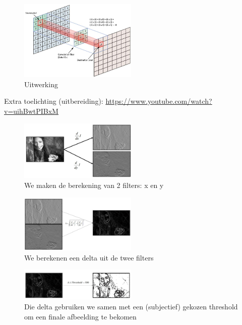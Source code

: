 \documentclass{article}
\begin{document}
\begin{figure}[H]
    \centering
    \includegraphics[width=0.5\textwidth]{sobel-edgedetection2.png}
    \caption{Uitwerking}
\end{figure}


Extra toelichting (uitbereiding): \url{https://www.youtube.com/watch?v=uihBwtPIBxM}

\begin{figure}[H]
    \centering
    \includegraphics[width=0.5\textwidth]{sobel.png}
    \caption{We maken de berekening van 2 filters: x en y}
\end{figure}

\begin{figure}[H]
    \centering
    \includegraphics[width=0.5\textwidth]{sobel2.png}
    \caption{We berekenen een delta uit de twee filters}
\end{figure}

\begin{figure}[H]
    \centering
    \includegraphics[width=0.5\textwidth]{sobel3.png}
    \caption{Die delta gebruiken we samen met een (subjectief) gekozen threshold om een finale afbeelding te bekomen}
\end{figure}
\end{document}
